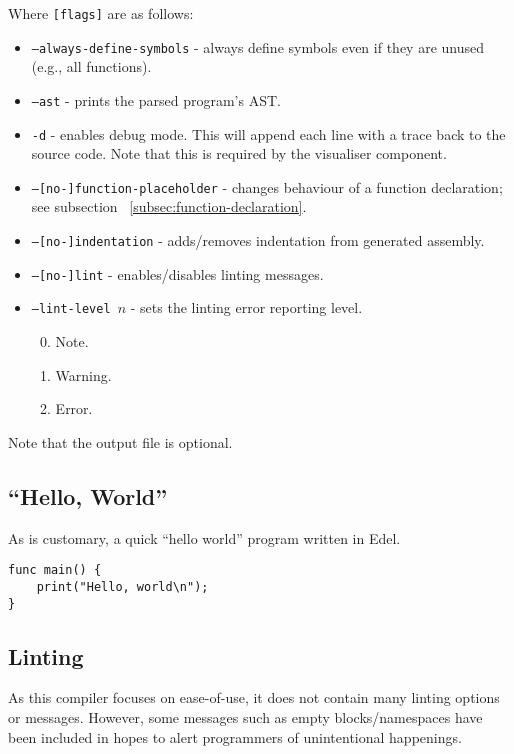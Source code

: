 Where \texttt{[flags]} are as follows:
\begin{itemize}
    \item \texttt{--always-define-symbols} - always define symbols even if they are unused (e.g., all functions).
    \item \texttt{--ast} - prints the parsed program's AST.
    \item \texttt{-d} - enables debug mode.
    This will append each line with a trace back to the source code.
    Note that this is required by the visualiser component.
    \item \texttt{--[no-]function-placeholder} - changes behaviour of a function declaration; see subsection ~\ref{subsec:function-declaration}.
    \item \texttt{--[no-]indentation} - adds/removes indentation from generated assembly.
    \item \texttt{--[no-]lint} - enables/disables linting messages.
    \item \texttt{--lint-level \(n\)} - sets the linting error reporting level.
    \begin{enumerate} \setcounter{enumi}{-1}
        \item Note.
        \item Warning.
        \item Error.
    \end{enumerate}
\end{itemize}
Note that the output file is optional.

\subsection{``Hello, World''}\label{subsec:hello-world}

As is customary, a quick ``hello world'' program written in Edel.

\begin{lstlisting}[language=CustomLang]
func main() {
    print("Hello, world\n");
}
\end{lstlisting}

\subsection{Linting}

As this compiler focuses on ease-of-use, it does not contain many linting options or messages.
However, some messages such as empty blocks/namespaces have been included in hopes to alert programmers of unintentional happenings.